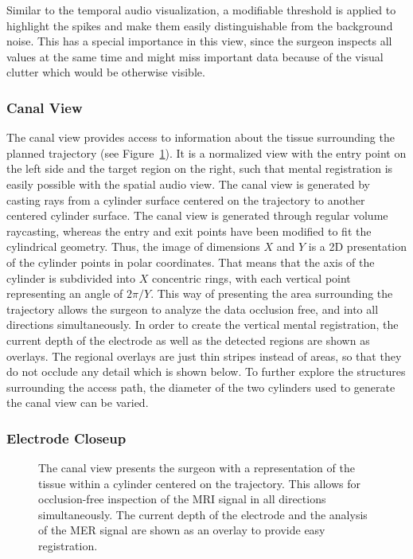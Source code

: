 \documentclass[journal]{vgtc}                %
\begin{document}
Similar to the temporal audio visualization, a modifiable threshold is applied to highlight the spikes and make them easily distinguishable from the background noise. This has a special importance in this view, since the surgeon inspects all values at the same time and might miss important data because of the visual clutter which would be otherwise visible.


\subsubsection{Canal View}\label{sec:overview:placement:canal}

The canal view provides access to information about the tissue surrounding the planned trajectory (see Figure~\ref{fig:placementphase:canal}). It is a normalized view with the entry point on the left side and the target region on the right, such that mental registration is easily possible with the spatial audio view. The canal view is generated by casting rays from a cylinder surface centered on the trajectory to another centered cylinder surface. The canal view is generated through regular volume raycasting, whereas the entry and exit points have been modified to fit the cylindrical geometry. Thus, the image of dimensions $X$ and $Y$ is a 2D presentation of the cylinder points in polar coordinates. That means that the axis of the cylinder is subdivided into $X$ concentric rings, with each vertical point representing an angle of $2 \pi / Y$. This way of presenting the area surrounding the trajectory allows the surgeon to analyze the data occlusion free, and into all directions simultaneously. In order to create the vertical mental registration, the current depth of the electrode as well as the detected regions are shown as overlays. The regional overlays are just thin stripes instead of areas, so that they do not occlude any detail which is shown below. To further explore the structures surrounding the access path, the diameter of the two cylinders used to generate the canal view can be varied. 


\subsubsection{Electrode Closeup}\label{sec:overview:placement:targetareaview}

\begin{figure}[b]
    \centering
    \caption{The canal view presents the surgeon with a representation of the tissue within a cylinder centered on the trajectory. This allows for occlusion-free inspection of the MRI signal in all directions simultaneously. The current depth of the electrode and the analysis of the MER signal are shown as an overlay to provide easy registration.}
    \label{fig:placementphase:canal}
\end{figure}
\end{document}

